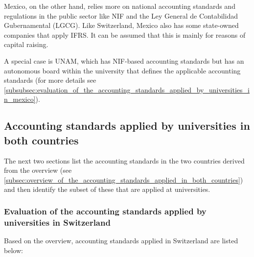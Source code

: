 \documentclass[10pt]{article}
\begin{document}
Mexico, on the other hand, relies more on national accounting standards and regulations in the public sector like NIF and the Ley General de Contabilidad Gubernamental (LGCG). Like Switzerland, Mexico also has some state-owned companies that apply IFRS. It can be assumed that this is mainly for reasons of capital raising.

A special case is UNAM, which has NIF-based accounting standards but has an autonomous board within the university that defines the applicable accounting standards (for more details see \vref{subsubsec:evaluation_of_the_accounting_standards_applied_by_universities_in_mexico}).

\subsection{Accounting standards applied by universities in both countries}\label{subsec:accounting_standards_applied_by_universities_in_both_countries}
The next two sections list the accounting standards in the two countries derived from the overview (see \vref{subsec:overview_of_the_accounting_standards_applied_in_both_countries}) and then identify the subset of these that are applied at universities.

\subsubsection{Evaluation of the accounting standards applied by universities in Switzerland}\label{subsubsec:evaluation_of_the_accounting_standards_applied_by_universities_in_switzerland}
Based on the overview, accounting standards applied in Switzerland are listed below:
\end{document}
